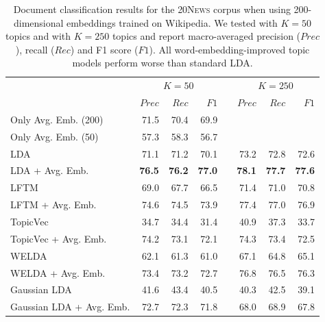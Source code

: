 \documentclass[
        a4paper,
        titlepage,
        twoside,
        parskip
        ]{scrbook}
\newcommand{\ra}[1]{\renewcommand{\arraystretch}{#1}}
\theoremstyle{break}
\begin{document}
\begin{table}[]
  \ra{1.3}
  \centering
  \caption{Document classification results for the \textsc{20News} corpus when using 200-dimensional embeddings trained on Wikipedia.
  We tested with $K = 50$ topics and with $K = 250$ topics and report macro-averaged precision ($Prec$), recall ($Rec$) and F1 score ($F1$).
  All word-embedding-improved topic models perform worse than standard LDA.}
  \label{table:document_classification_dim-200}
  \begin{tabular}{lrrrcrrr}
    \toprule
    \multirow{2}{*}{} & \multicolumn{3}{c}{$K = 50$} & \phantom{a} & \multicolumn{3}{c}{$K = 250$} \\ \cmidrule{2-4} \cmidrule{6-8}
                      & $Prec$    & $Rec$     & $F1$     && $Prec$    & $Rec$   & $F1$     \\ \midrule
                      Only Avg. Emb. (200)     & 71.5    & 70.4    & 69.9   && \multicolumn{3}{l}{}        \\
                      Only Avg. Emb. (50)      & 57.3    & 58.3    & 56.7   && \multicolumn{3}{l}{}        \\
                      LDA                      & 71.1    & 71.2    & 70.1   && 73.2    & 72.8     & 72.6   \\
                      LDA + Avg. Emb.          & \textbf{76.5}    & \textbf{76.2}    & \textbf{77.0}   && \textbf{78.1}    & \textbf{77.7}     & \textbf{77.6}   \\
                      LFTM                     & 69.0    & 67.7    & 66.5   && 71.4    & 71.0     & 70.8   \\
                      LFTM + Avg. Emb.         & 74.6    & 74.5    & 73.9   && 77.4    & 77.0     & 76.9   \\
                      TopicVec                 & 34.7    & 34.4    & 31.4   && 40.9    & 37.3     & 33.7   \\
                      TopicVec + Avg. Emb.     & 74.2    & 73.1    & 72.1   && 74.3    & 73.4     & 72.5   \\
                      WELDA                    & 62.1    & 61.3    & 61.0   && 67.1    & 64.8     & 65.1   \\
                      WELDA + Avg. Emb.        & 73.4    & 73.2    & 72.7   && 76.8    & 76.5     & 76.3   \\
                      Gaussian LDA             & 41.6    & 43.4    & 40.5   && 40.3    & 42.5     & 39.1   \\
                      Gaussian LDA + Avg. Emb. & 72.7    & 72.3    & 71.8   && 68.0    & 68.9     & 67.8   \\
  \bottomrule
  \end{tabular}
\end{table}
\end{document}
